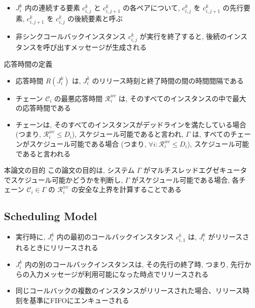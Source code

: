 \begin{frame}{}
    \begin{itemize}
        \item $J_{i}^{k}$ 内の連続する要素 $c_{i, j}^{k}$ と $c_{i, j+1}^{k}$ の各ペアについて, $c_{i, j}^{k}$ を $c_{i, j+1}^{k}$ の先行要素, $c_{i, j+1}^{k}$ を $c_{i, j}^{k}$ の後続要素と呼ぶ
        \item 非シンクコールバックインスタンス $c_{i, j}^{k}$ が実行を終了すると, 後続のインスタンスを呼び出すメッセージが生成される
    \end{itemize}
\end{frame}

\begin{frame}{応答時間の定義}
    \begin{itemize}
        \item 応答時間 $R\left(J_{i}^{k}\right)$ は,  $J_{i}^{k}$ のリリース時刻と終了時間の間の時間間隔である
        \item チェーン $\mathcal{C}_{i}$ の最悪応答時間 $\mathcal{R}_{i}^{w c}$ は, そのすべてのインスタンスの中で最大の応答時間である
        \item チェーンは, そのすべてのインスタンスがデッドラインを満たしている場合 (つまり, $\mathcal{R}_{i}^{w c} \leq D_{i}$), スケジュール可能であると言われ, $\Gamma$ は, すべてのチェーンがスケジュール可能である場合 (つまり, $\forall i: \mathcal{R}_{i}^{w c} \leq D_{i}$), スケジュール可能であると言われる
    \end{itemize}
\end{frame}

\begin{frame}{本論文の目的}
    この論文の目的は, システム $\Gamma$ がマルチスレッドエグゼキュータでスケジュール可能かどうかを判断し, $\Gamma$ がスケジュール可能である場合, 各チェーン $\mathcal{C}_{i} \in \Gamma$ の $\mathcal{R}_{i}^{w c}$ の安全な上界を計算することである
\end{frame}


\subsection{Scheduling Model}
\label{ssec: scheduling_model}


\begin{frame}{}
    \begin{itemize}
        \item 実行時に, $J_{i}^{k}$ 内の最初のコールバックインスタンス $c_{i, 1}^{k}$ は, $J_{i}^{k}$ がリリースされるときにリリースされる
        \item $J_{i}^{k}$ 内の別のコールバックインスタンスは, その先行の終了時, つまり, 先行からの入力メッセージが利用可能になった時点でリリースされる
        \item 同じコールバックの複数のインスタンスがリリースされた場合、リリース時刻を基準にFIFOにエンキューされる
    \end{itemize}
\end{frame}

